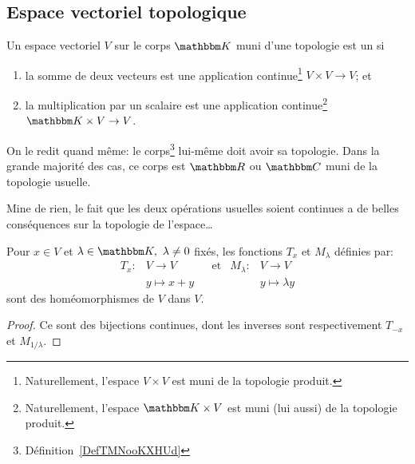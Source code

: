 \subsection{Espace vectoriel topologique}

\begin{definition}\label{DefEVTopologique}
  Un espace vectoriel \( V\) sur le corps \( \eK\) muni d'une topologie est un  si
    \begin{enumerate}
        \item
            la somme de deux vecteurs est une application continue\footnote{Naturellement, l'espace \(V \times V \) est muni de la topologie produit.} \( V\times V\to V \); et
        \item
            la multiplication par un scalaire est une application continue\footnote{Naturellement, l'espace \(\eK \times V \) est muni (lui aussi) de la topologie produit.} \( \eK\times V\to V\).
    \end{enumerate}
\end{definition}
On le redit quand même: le corps\footnote{Définition~\ref{DefTMNooKXHUd}} lui-même doit avoir sa topologie. Dans la grande majorité des cas, ce corps est \( \eR\) ou \( \eC\) muni de la topologie usuelle.

Mine de rien, le fait que les deux opérations usuelles soient continues a de belles conséquences sur la topologie de l'espace\dots

\begin{proposition}
  Pour \(x \in V \) et \(\lambda \in \eK, \ \lambda \neq 0 \) fixés, les fonctions \( T_x \) et \( M_\lambda \) définies par:
  \begin{align}
    T_x:&V \to V & &\text{et}&M_\lambda:&V \to V\\
    & y \mapsto x+y & & & &y \mapsto \lambda y
  \end{align}
sont des homéomorphismes de \(V \) dans \(V \).
\end{proposition}

\begin{proof}
  Ce sont des bijections continues, dont les inverses sont respectivement \( T_{-x} \) et \( M_{1/\lambda} \).
\end{proof}

